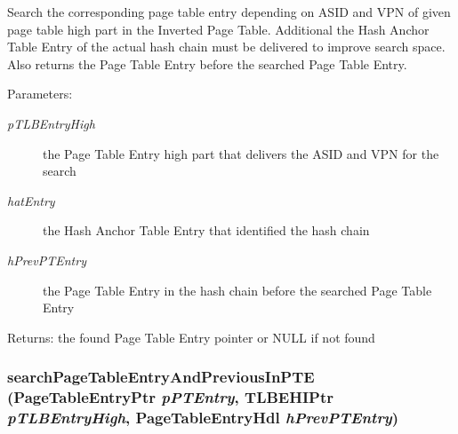 Search the corresponding page table entry depending on ASID and VPN of given page table high part in the Inverted Page Table. Additional the Hash Anchor Table Entry of the actual hash chain must be delivered to improve search space. Also returns the Page Table Entry before the searched Page Table Entry. \begin{Desc}
\item[Parameters:]
\begin{description}
\item[{\em pTLBEntryHigh}]the Page Table Entry high part that delivers the ASID and VPN for the search \item[{\em hatEntry}]the Hash Anchor Table Entry that identified the hash chain \item[{\em hPrevPTEntry}]the Page Table Entry in the hash chain before the searched Page Table Entry \end{description}
\end{Desc}
\begin{Desc}
\item[Returns:]the found Page Table Entry pointer or NULL if not found \end{Desc}
\hypertarget{group___v_m_m___i_p_t_gceafcd302dd2b1aca0074e443f53d093}{
\subsubsection[{searchPageTableEntryAndPreviousInPTE}]{ searchPageTableEntryAndPreviousInPTE ({\bf PageTableEntryPtr} {\em pPTEntry}, \/  {\bf TLBEHIPtr} {\em pTLBEntryHigh}, \/  {\bf PageTableEntryHdl} {\em hPrevPTEntry})}}
\label{group___v_m_m___i_p_t_gceafcd302dd2b1aca0074e443f53d093}


